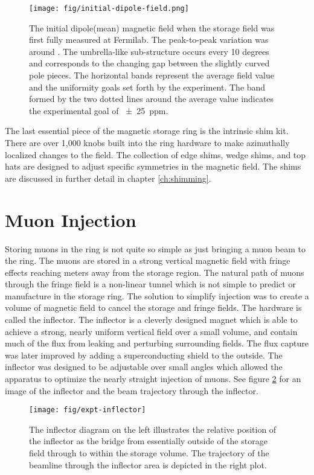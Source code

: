 \begin{figure}
\label{fig:initial-field}
\centering
\texttt{[image: fig/initial-dipole-field.png]}
\caption{The initial dipole(mean) magnetic field when the storage field was first fully measured at Fermilab.  The peak-to-peak variation was around .  The umbrella-like sub-structure occurs every 10 degrees and corresponds to the changing gap between the slightly curved pole pieces.  The horizontal bands represent the average field value and the uniformity goals set forth by the experiment.  The band formed by the two dotted lines around the average value indicates the experimental goal of \SI{\pm 25}{ppm}.}
\end{figure}

The last essential piece of the magnetic storage ring is the intrinsic shim kit.  There are over 1,000 knobs built into the ring hardware to make azimuthally localized changes to the field. The collection of edge shims, wedge shims, and top hats are designed to adjust specific symmetries in the magnetic field.  The shims are discussed in further detail in chapter \ref{ch:shimming}.

\section{Muon Injection} \label{sec:muon-injection}

Storing muons in the ring is not quite so simple as just bringing a muon beam to the ring.  The muons are stored in a strong vertical magnetic field with fringe effects reaching meters away from the storage region.  The natural path of muons through the fringe field is a non-linear tunnel which is not simple to predict or manufacture in the storage ring.  The solution to simplify injection was to create a volume of magnetic field to cancel the storage and fringe fields. The hardware is called the inflector.  The inflector is a cleverly designed magnet which is able to achieve a strong, nearly uniform vertical field over a small volume, and contain much of the flux from leaking and perturbing surrounding fields.  The flux capture was later improved by adding a superconducting shield to the outside.  The inflector was designed to be adjustable over small angles which allowed the apparatus to optimize the nearly straight injection of muons. See figure \ref{fig:expt-inflector} for an image of the inflector and the beam trajectory through the inflector. \cite{e989-tdr, e821-prd}

\begin{figure}
\label{fig:expt-inflector}
\texttt{[image: fig/expt-inflector]}
\caption{The inflector diagram on the left illustrates the relative position of the inflector as the bridge from essentially outside of the storage field through to within the storage volume.  The trajectory of the beamline through the inflector area is depicted in the right plot.}
\end{figure}


